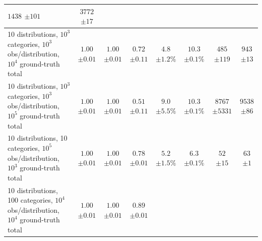 \documentclass{article}
\theoremstyle{plain}
\theoremstyle{definition}
\theoremstyle{remark}
\begin{document}
\begin{table}[h]
\begin{center}
\begin{scriptsize}
\begin{sc}
\begin{tabular}{l||c|c|c||c|c||c|c}
\makecell{$1438$\\$\pm 101$} & \makecell{$3772$\\$\pm 17$} \\
\hline
\makecell{10 distributions, $10^3$ categories,\\$10^3$ obs/distribution, $10^4$ ground-truth total} & 
\makecell{$1.00$\\$\pm 0.01$} & \makecell{$1.00$\\$\pm 0.01$} & \makecell{$0.72$\\$\pm 0.11$} & 
\makecell{$4.8$\\$\pm 1.2\%$} & \makecell{$10.3$\\$\pm 0.1\%$} & 
\makecell{$485$\\$\pm 119$} & \makecell{$943$\\$\pm 13$} \\
\hline
\makecell{10 distributions, $10^3$ categories,\\$10^3$ obs/distribution, $10^5$ ground-truth total} & 
\makecell{$1.00$\\$\pm 0.01$} & \makecell{$1.00$\\$\pm 0.01$} & \makecell{$0.51$\\$\pm 0.11$} & 
\makecell{$9.0$\\$\pm 5.5\%$} & \makecell{$10.3$\\$\pm 0.1\%$} & 
\makecell{$8767$\\$\pm 5331$} & \makecell{$9538$\\$\pm 86$} \\
\hline
\makecell{10 distributions, 10 categories,\\$10^5$ obs/distribution, $10^3$ ground-truth total} & 
\makecell{$1.00$\\$\pm 0.01$} & \makecell{$1.00$\\$\pm 0.01$} & \makecell{$0.78$\\$\pm 0.01$} & 
\makecell{$5.2$\\$\pm 1.5\%$} & \makecell{$6.3$\\$\pm 0.1\%$} & 
\makecell{$52$\\$\pm 15$} & \makecell{$63$\\$\pm 1$} \\
\hline
\makecell{10 distributions, 100 categories,\\$10^4$ obs/distribution, $10^4$ ground-truth total} & 
\makecell{$1.00$\\$\pm 0.01$} & \makecell{$1.00$\\$\pm 0.01$} & \makecell{$0.89$\\$\pm 0.01$} & 

\end{tabular}
\end{sc}
\end{scriptsize}
\end{center}
\end{table}
\end{document}
